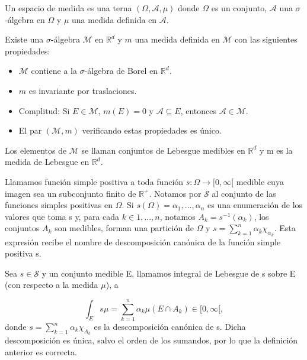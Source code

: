 \begin{definicion}
Un espacio de medida es una terna $(\Omega,\mathcal{A},\mu)$ donde $\Omega$ es un conjunto, $\mathcal{A}$ una $\sigma$-álgebra en $\Omega$ y $\mu$ una medida definida en $\mathcal{A}$. 
\end{definicion}

\begin{teorema}
Existe una $\sigma$-álgebra $\mathcal{M}$ en $\mathds{R}^{d}$ y $m$ una medida definida en $\mathcal{M}$ con las siguientes propiedades: 
\begin{itemize}
	\item $\mathcal{M}$ contiene a la $\sigma$-álgebra de Borel en $\mathds{R}^{d}$.
	\item $m$ es invariante por traslaciones.
	\item Complitud: Si $E\in\mathcal{M}$, $m(E)=0$ y $\mathcal{A}\subseteq E$, entonces $\mathcal{A}\in\mathcal{M}$.
	\item El par $(\mathcal{M},m)$ verificando estas propiedades es único.
\end{itemize}

Los elementos de $\mathcal{M}$ se llaman conjuntos de Lebesgue medibles en $\mathds{R}^{d}$ y m es la medida de Lebesgue en $\mathds{R}^{d}$. 
\end{teorema}

\begin{definicion}
Llamamos función simple positiva a toda función $s:\Omega\rightarrow[0,\infty[$ medible cuya imagen sea un subconjunto finito de $\mathds{R}^{+}$. Notamos por $\mathcal{S}$ al conjunto de las funciones simples positivas en $\Omega$. Si $s(\Omega) = { \alpha_{1},...,\alpha_{n} }$ es una enumeración de los valores que toma s y, para cada $k\in{1,...,n}$, notamos $A_{k}=s^{-1}({\alpha_{k}})$, los conjuntos $A_{k}$ son medibles, forman una partición de $\Omega$ y $s=\sum_{k=1}^{n}\alpha_{k}\chi_{\alpha_{k}}$. Esta expresión recibe el nombre de descomposición canónica de la función simple positiva s. 
\end{definicion}

\begin{definicion}

Sea $s\in \mathcal{S}$ y un conjunto medible E, llamamos integral de Lebesgue de s sobre E (con respecto a la medida $\mu$), a

$$\int_{E}s \mu = \sum_{k=1}^{n}\alpha_{k}\mu(E\cap A_{k}) \in [0,\infty[,$$
donde $s=\sum_{k=1}^{n} \alpha_{k}\chi_{A_{k}}$ es la descomposición canónica de s. Dicha descomposición es única, salvo el orden de los sumandos, por lo que la definición anterior es correcta.

\end{definicion}

